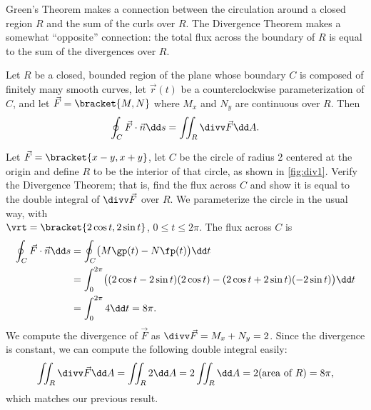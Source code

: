 Green's Theorem makes a connection between the circulation around a closed region $R$ and the sum of the curls over $R$. The Divergence Theorem makes a somewhat ``opposite'' connection: the total flux across the boundary of $R$ is equal to the sum of the divergences over $R$. 

\begin{theorem}\label{thm:divergence1}
Let $R$ be a closed, bounded region of the plane whose boundary $C$ is composed of finitely many smooth curves, let $\vec r(t)$ be a counterclockwise parameterization of $C$, and let $\vec F =\bracket{M,N}$ where $M_x$ and $N_y$ are continuous over $R$. Then
\[\oint_C \vec F\cdot \vec n\dd s = \iint_R\divv \vec F\dd A.\]
\end{theorem}


\begin{example}\label{ex_div1}
Let $\vec F =\bracket{x-y,x+y}$, let $C$ be the circle of radius 2 centered at the origin and define $R$ to be the interior of that circle, as shown in \autoref{fig:div1}. Verify the Divergence Theorem; that is, find the flux across $C$ and show it is equal to the double integral of $\divv \vec F$ over $R$.
\solution
We parameterize the circle in the usual way, with\\
$\vrt =\bracket{2\cos t,2\sin t}$, $0\leq t\leq 2\pi$. The flux across $C$ is
\begin{align*}
	\oint_C \vec F\cdot \vec n\dd s
	&= \oint_C\bigl(M\gp(t)-N\fp(t)\bigr)\dd t\\
	&= \int_0^{2\pi} \bigl((2\cos t-2\sin t)(2\cos t) - (2\cos t+2\sin t)(-2\sin t)\bigr)\dd t\\
	&= \int_0^{2\pi} 4\dd t = 8\pi.
\end{align*}
We compute the divergence of $\vec F$ as $\divv \vec F = M_x+N_y = 2$. Since the divergence is constant, we can compute the following double integral easily:
\[
\iint_R \divv \vec F\dd A = \iint_R 2\dd A = 2\iint_R\dd A
= 2(\text{area of $R$}) = 8\pi,
\]
which matches our previous result.
\end{example}

